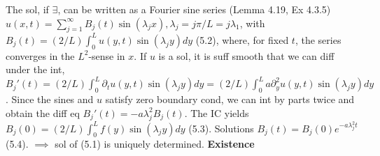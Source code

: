 The sol, if $\exists$, can be written as a Fourier sine series (Lemma 4.19, Ex 4.3.5) $u(x,t)=\sum_{j=1}^{\infty}B_j(t)\sin(\lambda_jx), \lambda_j=j\pi/L=j\lambda_1$, with $B_j(t) = (2/L)\int_0^L u(y,t) \sin(\lambda_j y)dy$ (5.2), where, for fixed $t$, the series converges in the $L^2$-sense in $x$. If $u$ is a sol, it is suff smooth that we can diff under the int, $B_j'(t) = (2/L) \int_0^L \partial_tu(y,t)\sin(\lambda_jy)dy=(2/L)\int_0^L a\partial_y^2 u(y,t)\sin(\lambda_jy)dy$. Since the sines and $u$ satisfy zero boundary cond, we can int by parts twice and obtain the diff eq $B_j'(t)=-a \lambda_j^2B_j(t)$. The IC yields $B_j(0)=(2/L)\int_0^L f(y) \sin(\lambda_jy)dy$ (5.3). Solutions $B_j(t)=B_j(0)e^{-a\lambda_j^2t}$ (5.4). $\implies$ sol of (5.1) is uniquely determined. 
{\bf Existence} 